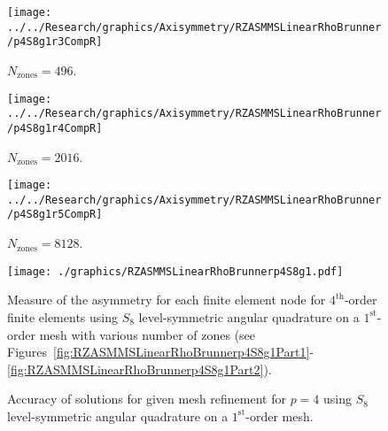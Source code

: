 \documentclass[12pt]{article}
\begin{document}
\begin{sidewaysfigure}[!htb]
\centering
\begin{subfigure}{0.33\textwidth}
\texttt{[image: ../../Research/graphics/Axisymmetry/RZASMMSLinearRhoBrunner/p4S8g1r3CompR]}
\caption{$N_\text{zones}=496$.}
\end{subfigure}%
\begin{subfigure}{0.33\textwidth}
\texttt{[image: ../../Research/graphics/Axisymmetry/RZASMMSLinearRhoBrunner/p4S8g1r4CompR]}
\caption{$N_\text{zones}=2016$.}
\end{subfigure}%
\begin{subfigure}{0.33\textwidth}
\texttt{[image: ../../Research/graphics/Axisymmetry/RZASMMSLinearRhoBrunner/p4S8g1r5CompR]}
\caption{$N_\text{zones}=8128$.}
\end{subfigure}
\caption{Relative asymmetry for $p=4$ finite elements on a $1^\text{st}$-order mesh for $S_8$ level-symmetric angular quadrature for $N_\text{zones}=\{496,2016,8128\}$; mesh overlay may be removed for clarity.}
\label{fig:RZASMMSLinearRhoBrunnerp4S8g1Part2}
\end{sidewaysfigure}

\begin{figure}[!htb]
\centering
\texttt{[image: ./graphics/RZASMMSLinearRhoBrunnerp4S8g1.pdf]}
\caption{Measure of the asymmetry for each finite element node for $4^\text{th}$-order finite elements using $S_8$ level-symmetric angular quadrature on a $1^\text{st}$-order mesh with various number of zones (see Figures~\ref{fig:RZASMMSLinearRhoBrunnerp4S8g1Part1}-\ref{fig:RZASMMSLinearRhoBrunnerp4S8g1Part2}).}
\label{fig:RZASMMSLinearRhoBrunnerp4S8g1Nodes}
\end{figure}

\begin{figure}[!htb]
\centering
{}
\caption{Accuracy of solutions for given mesh refinement for $p=4$ using $S_8$ level-symmetric angular quadrature on a $1^\text{st}$-order mesh.}
\label{fig:RZASMMSLinearRhoBrunnerp4S8g1Accuracy}
\end{figure}
\end{document}
